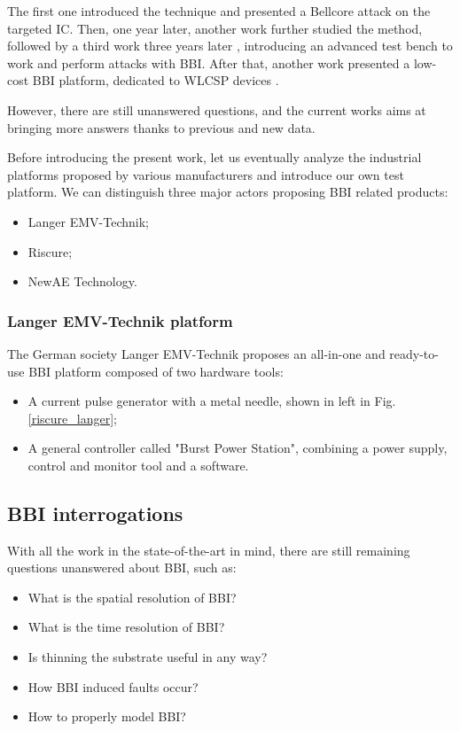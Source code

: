 		The first one \cite{bbiOrigin} introduced the technique and presented a Bellcore attack on the targeted IC.
		Then, one year later, another work \cite{bbiSecond} further studied the method, followed by a third work three years later \cite{bbiThird}, introducing an advanced test bench to work and perform attacks with BBI.
		After that, another work presented a low-cost BBI platform, dedicated to WLCSP devices \cite{bbiColin}.

		However, there are still unanswered questions, and the current works aims at bringing more answers thanks to previous and new data.

		Before introducing the present work, let us eventually analyze the industrial platforms proposed by various manufacturers and introduce our own test platform.
		We can distinguish three major actors proposing BBI related products:
		\begin{itemize}
			\item Langer EMV-Technik;
			\item Riscure;
			\item NewAE Technology.
		\end{itemize}

		
		\subsubsection{Langer EMV-Technik platform}
			The German society Langer EMV-Technik proposes an all-in-one and ready-to-use BBI platform composed of two hardware tools:
			\begin{itemize}
				\item A current pulse generator with a metal needle, shown in left in Fig. \ref{riscure_langer};
				\item A general controller called "Burst Power Station", combining a power supply, control and monitor tool and a software.
			\end{itemize}

	\subsection{BBI interrogations}
		With all the work in the state-of-the-art in mind, there are still remaining questions unanswered about BBI, such as:
		\begin{itemize}
			\item What is the spatial resolution of BBI?
			\item What is the time resolution of BBI?
			\item Is thinning the substrate useful in any way?
			\item How BBI induced faults occur?
			\item How to properly model BBI?
		\end{itemize}
